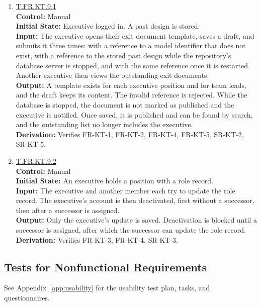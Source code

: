 \documentclass[12pt, titlepage]{article}
\newcommand{\testdef}[1]{\leavevmode\hypertarget{test:#1}{}\hyperlink{trace:#1}{#1}}
\begin{document}
\begin{enumerate}

\item \testdef{T.FR.KT.9.1}\\
\textbf{Control:} Manual\\
\textbf{Initial State:} Executive logged in. A past design is stored.\\
\textbf{Input:} The executive opens their exit document template, saves a draft,
and submits it three times: with a reference to a model identifier that does not
exist, with a reference to the stored past design while the repository's
database server is stopped, and with the same reference once it is restarted.
Another executive then views the outstanding exit documents.\\
\textbf{Output:} A template exists for each executive position and for team
leads, and the draft keeps its content. The invalid reference is rejected. While
the database is stopped, the document is not marked as published and the
executive is notified. Once saved, it is published and can be found by search, and
the outstanding list no longer includes the executive.\\
\textbf{Derivation:} Verifies FR-KT-1, FR-KT-2, FR-KT-4, FR-KT-5, SR-KT-2,
SR-KT-5.

\item \testdef{T.FR.KT.9.2}\\
\textbf{Control:} Manual\\
\textbf{Initial State:} An executive holds a position with a role record.\\
\textbf{Input:} The executive and another member each try to update the role
record. The executive's account is then deactivated, first without a successor,
then after a successor is assigned.\\
\textbf{Output:} Only the executive's update is saved. Deactivation is blocked
until a successor is assigned, after which the successor can update the role
record.\\
\textbf{Derivation:} Verifies FR-KT-3, FR-KT-4, SR-KT-3.

\end{enumerate}

\subsection{Tests for Nonfunctional Requirements} \label{SecNFRTests}

See Appendix~\ref{app:usability} for the usability test plan, tasks, and questionnaires.
\end{document}
